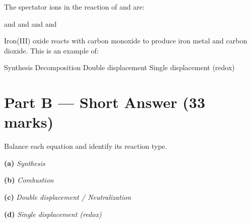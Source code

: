 \documentclass[addpoints]{exam}
\begin{document}
\begin{questions}
\question[1] The spectator ions in the reaction of  and  are:
\begin{choices}
    \choice {} and 
    \correctchoice {} and 
    \choice {} and 
    \choice {} and 
\end{choices}

\question[1] Iron(III) oxide reacts with carbon monoxide to produce iron metal and carbon
dioxide. This is an example of:
\begin{choices}
    \choice Synthesis
    \choice Decomposition
    \choice Double displacement
    \correctchoice Single displacement (redox)
\end{choices}


\section*{Part B --- Short Answer (33 marks)}

\question Balance each equation and identify its reaction type.
\begin{solution}[9cm]
\textbf{(a)} \quad \textit{Synthesis}

\textbf{(b)} \quad \textit{Combustion}

\textbf{(c)} \quad \textit{Double displacement / Neutralization}

\textbf{(d)} \quad \textit{Single displacement (redox)}
\end{solution}


\end{questions}
\end{document}
